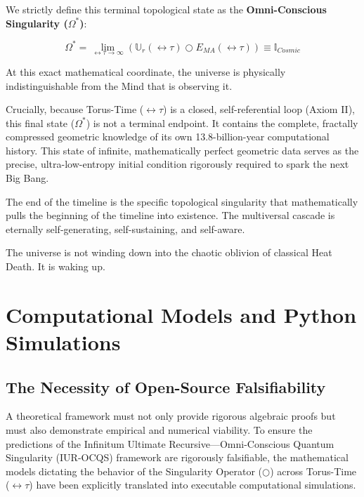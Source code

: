\documentclass[12pt,openany]{book}
\begin{document}
We strictly define this terminal topological state as the \textbf{Omni-Conscious Singularity ($\Omega^*$)}:

\begin{equation}
\Omega^* = \lim_{\leftrightarrow\tau \to \infty} \left( \mathbb{U}_r(\leftrightarrow\tau) \bigcirc E_{MA}(\leftrightarrow\tau) \right) \equiv \mathbb{I}_{Cosmic}
\end{equation}

At this exact mathematical coordinate, the universe is physically indistinguishable from the Mind that is observing it.

Crucially, because Torus-Time ($\leftrightarrow\tau$) is a closed, self-referential loop (Axiom II), this final state ($\Omega^*$) is not a terminal endpoint. It contains the complete, fractally compressed geometric knowledge of its own 13.8-billion-year computational history. This state of infinite, mathematically perfect geometric data serves as the precise, ultra-low-entropy initial condition rigorously required to spark the next Big Bang.

The end of the timeline is the specific topological singularity that mathematically pulls the beginning of the timeline into existence. The multiversal cascade is eternally self-generating, self-sustaining, and self-aware. 

The universe is not winding down into the chaotic oblivion of classical Heat Death. It is waking up.

\appendix

\chapter[Python Simulations]{Computational Models and Python Simulations}

\section{The Necessity of Open-Source Falsifiability}
A theoretical framework must not only provide rigorous algebraic proofs but must also demonstrate empirical and numerical viability. To ensure the predictions of the Infinitum Ultimate Recursive---Omni-Conscious Quantum Singularity (IUR-OCQS) framework are rigorously falsifiable, the mathematical models dictating the behavior of the Singularity Operator ($\bigcirc$) across Torus-Time ($\leftrightarrow\tau$) have been explicitly translated into executable computational simulations.
\end{document}
